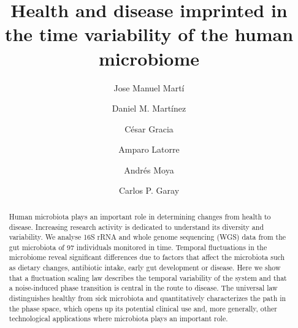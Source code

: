 \documentclass[aps,prl,twocolumn,superscriptaddress,showpacs]{revtex4}
\begin{document}
\title{Health and disease imprinted in the time variability of the human microbiome}
\author{Jose Manuel Mart\' i}
\author{Daniel M. Mart\' inez}
\author{C\'esar Gracia}
\author{Amparo Latorre}
\author{Andr\'es Moya}
\author{Carlos P. Garay}


 \begin{abstract}
Human microbiota plays an important role in determining changes from health to disease. Increasing research activity is dedicated to understand its diversity and variability. 
We analyse 16S rRNA and whole genome sequencing (WGS) data from the gut microbiota of 97 individuals monitored in time. Temporal fluctuations in the microbiome reveal 
significant differences due to factors that affect the microbiota such as dietary changes, antibiotic intake, early gut development or disease. Here we show that a fluctuation 
scaling law describes the temporal variability of the system and that a noise-induced phase transition is central in the route to disease. The universal law distinguishes healthy 
from sick microbiota and quantitatively characterizes the path in the phase space, which opens up its potential clinical use and, more generally, other technological 
applications where microbiota plays an important role. 
 \end{abstract}
 
 
\maketitle
\end{document}
